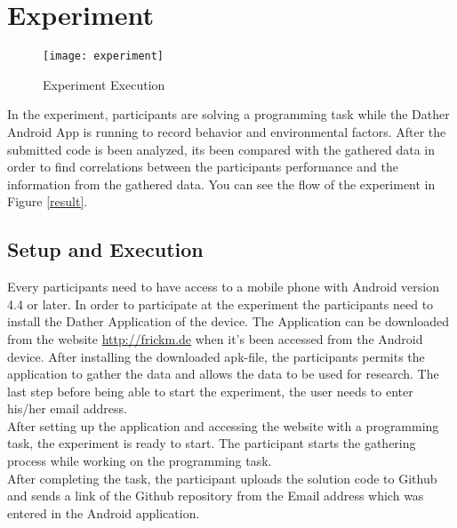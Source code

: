 \chapter{Experiment}

\begin{figure}
\texttt{[image: experiment]}
\caption{Experiment Execution}\label{experiment}
\vspace{10 mm}
\end{figure}

In the experiment, participants are solving a programming task while the Dather Android App is running to record behavior and environmental factors. After the submitted code is been analyzed, its been compared with the gathered data in order to find correlations between the participants performance and the information from the gathered data. You can see the flow of the experiment in Figure \ref{result}. 

\section{Setup and Execution}
Every participants need to have access to a mobile phone with Android version 4.4 or later. In order to participate at the experiment the participants need to install the Dather Application of the device. The Application can be downloaded from the website \url{http://frickm.de} when it's been accessed from the Android device. 
After installing the downloaded apk-file, the participants permits the application to gather the data and allows the data to be used for research. 
The last step before being able to start the experiment, the user needs to enter his/her email address.\\
After setting up the application and accessing the website with a programming task, the experiment is ready to start. The participant starts the gathering process while working on the programming task.\\
After completing the task, the participant uploads the solution code to Github and sends a link of the Github repository from the Email address which was entered in the Android application. 

